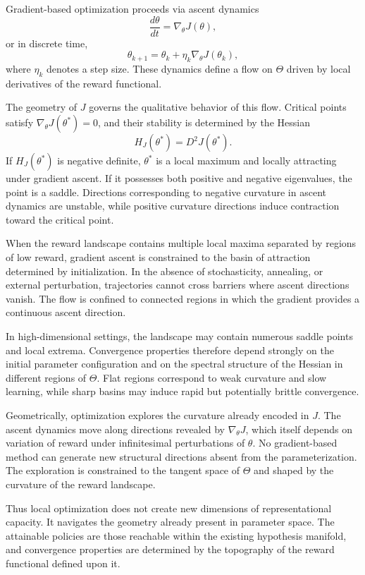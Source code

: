 \documentclass[12pt]{book}
\begin{document}
Gradient-based optimization proceeds via ascent dynamics
\[
\frac{d\theta}{dt}
=
\nabla_\theta J(\theta),
\]
or in discrete time,
\[
\theta_{k+1}
=
\theta_k
+
\eta_k \nabla_\theta J(\theta_k),
\]
where $\eta_k$ denotes a step size. These dynamics define a flow on $\Theta$ driven by local derivatives of the reward functional.

The geometry of $J$ governs the qualitative behavior of this flow. Critical points satisfy $\nabla_\theta J(\theta^\ast)=0$, and their stability is determined by the Hessian
\[
H_J(\theta^\ast)
=
D^2 J(\theta^\ast).
\]
If $H_J(\theta^\ast)$ is negative definite, $\theta^\ast$ is a local maximum and locally attracting under gradient ascent. If it possesses both positive and negative eigenvalues, the point is a saddle. Directions corresponding to negative curvature in ascent dynamics are unstable, while positive curvature directions induce contraction toward the critical point.

When the reward landscape contains multiple local maxima separated by regions of low reward, gradient ascent is constrained to the basin of attraction determined by initialization. In the absence of stochasticity, annealing, or external perturbation, trajectories cannot cross barriers where ascent directions vanish. The flow is confined to connected regions in which the gradient provides a continuous ascent direction.

In high-dimensional settings, the landscape may contain numerous saddle points and local extrema. Convergence properties therefore depend strongly on the initial parameter configuration and on the spectral structure of the Hessian in different regions of $\Theta$. Flat regions correspond to weak curvature and slow learning, while sharp basins may induce rapid but potentially brittle convergence.

Geometrically, optimization explores the curvature already encoded in $J$. The ascent dynamics move along directions revealed by $\nabla_\theta J$, which itself depends on variation of reward under infinitesimal perturbations of $\theta$. No gradient-based method can generate new structural directions absent from the parameterization. The exploration is constrained to the tangent space of $\Theta$ and shaped by the curvature of the reward landscape.

Thus local optimization does not create new dimensions of representational capacity. It navigates the geometry already present in parameter space. The attainable policies are those reachable within the existing hypothesis manifold, and convergence properties are determined by the topography of the reward functional defined upon it.
\end{document}

